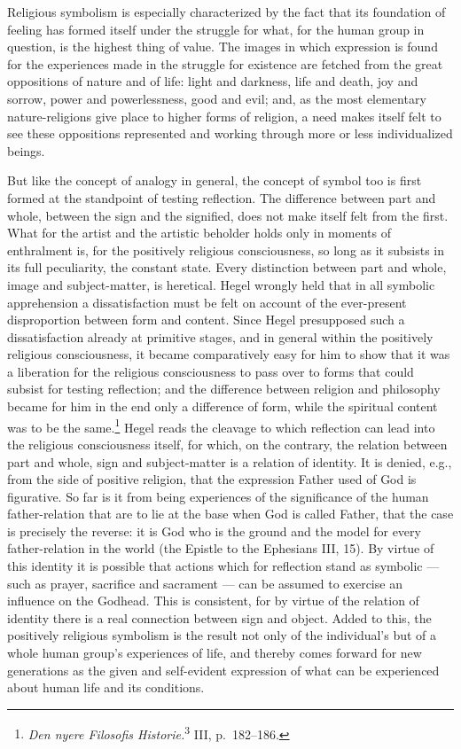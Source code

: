 \documentclass[12pt]{book}
\newcommand{\opage}[1]{\marginnote{\footnotesize\textit{[#1]}}}
\begin{document}
Religious symbolism is especially characterized by the fact that its foundation
of feeling has formed itself under the struggle for what, for the human group in
question, is the highest thing of value. The images in which expression is found
for the experiences made in the struggle for existence are fetched from the
great oppositions of nature and of life: light and darkness, life and death, joy
and sorrow, power and powerlessness, good and evil; and, as the most elementary
nature-religions give place to higher forms of religion, a need makes itself
felt to see these oppositions represented and working through more or less
individualized beings.

But like the concept of analogy in general, the concept of symbol too is first
formed at the standpoint of testing reflection. The difference between part and
whole, between the sign and the signified, does not make itself felt from the
first. What for the artist and the artistic beholder holds only in moments of
enthralment is, for the positively religious consciousness, so long as it
subsists in its full peculiarity, the constant state. Every distinction between
part and whole, image and subject-matter, is heretical. Hegel wrongly held that
in all symbolic apprehension a dissatisfaction must be felt on account of the
ever-present disproportion between form and content. Since Hegel presupposed
such a dissatisfaction already at primitive stages, and in general within the
positively religious consciousness, it became comparatively easy for him to show
that it was a liberation for the religious consciousness to pass over to forms
that could subsist for testing reflection; and the difference between religion
and philosophy became for him in the end \opage{34}only a difference of form, while the
spiritual content was to be the same.\footnote{\textit{Den nyere Filosofis
Historie.}\textsuperscript{3} III, p.\ 182--186.} Hegel reads the cleavage to
which reflection can lead into the religious consciousness itself, for which, on
the contrary, the relation between part and whole, sign and subject-matter is a
relation of identity. It is denied, e.g., from the side of positive religion,
that the expression Father used of God is figurative. So far is it from being
experiences of the significance of the human father-relation that are to lie at
the base when God is called Father, that the case is precisely the reverse: it
is God who is the ground and the model for every father-relation in the world
(the Epistle to the Ephesians III, 15). By virtue of this identity it is
possible that actions which for reflection stand as symbolic --- such as prayer,
sacrifice and sacrament --- can be assumed to exercise an influence on the
Godhead. This is consistent, for by virtue of the relation of identity there is
a real connection between sign and object. Added to this, the positively
religious symbolism is the result not only of the individual's but of a whole
human group's experiences of life, and thereby comes forward for new generations
as the given and self-evident expression of what can be experienced about human
life and its conditions.
\end{document}
